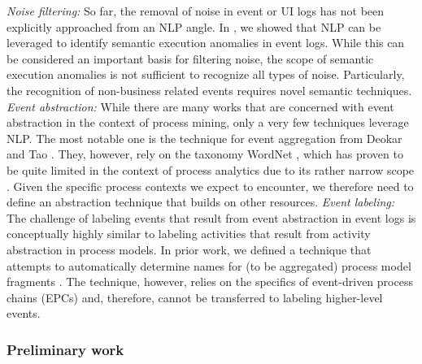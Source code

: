 \newline%
\noindent \textit{Noise filtering:} So far, the removal of noise in event or UI logs has not been explicitly approached from an NLP angle. In \cite{van2021natural}, we showed that NLP can be leveraged to identify semantic execution anomalies in event logs. While this can be considered an important basis for filtering noise, the scope of semantic execution anomalies is not sufficient to recognize all types of noise. Particularly, the recognition of non-business related events requires novel semantic techniques.   
 \vspace{0.2em}
\newline%
\noindent \textit{Event abstraction:} While there are many works that are concerned with event abstraction in the context of process mining, only a very few techniques leverage NLP. The most notable one is the technique for event aggregation from Deokar and Tao \cite{deokar2015semantics}. They, however, rely on the taxonomy WordNet \cite{miller1995wordnet}, which has proven to be quite limited in the context of process analytics due to its rather narrow scope \cite{leopold2015towards}. Given the specific process contexts we expect to encounter, we therefore need to define an abstraction technique that builds on other resources. 
 \vspace{0.2em}
\newline%
\noindent  \textit{Event labeling:}  The challenge of labeling events that result from event abstraction in event logs is conceptually highly similar to labeling activities that result from activity abstraction in process models. In prior work, we defined a technique that attempts to automatically determine names for (to be aggregated) process model fragments \cite{leopold2014simplifying}. The technique, however, relies on the specifics of event-driven process chains (EPCs) and, therefore, cannot be transferred to labeling higher-level events. 

\subsubsection{Preliminary work}

